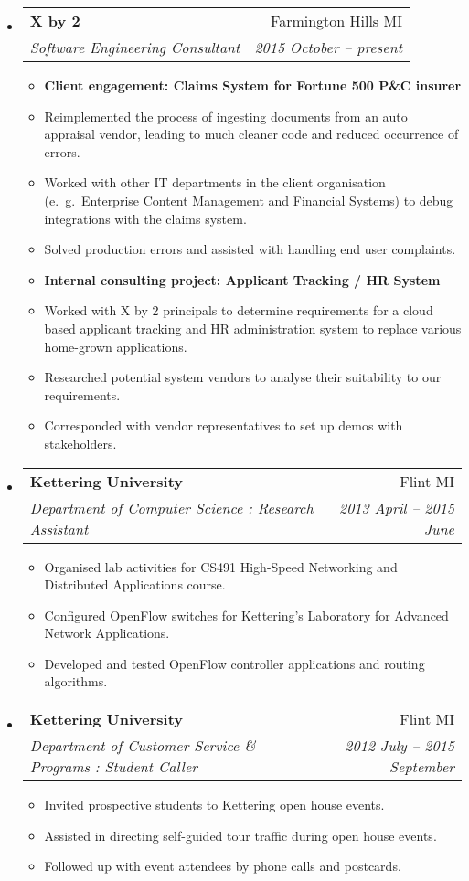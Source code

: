 \documentclass[letterpaper,10pt]{article}
\makeatletter
\newcommand{\resitem}[1]{\item #1 \vspace{-2pt}}
\newcommand{\ressubheading}[4]{
\begin{tabular*}{6.5in}{l@{\cftdotfill{\cftsecdotsep}\extracolsep{\fill}}r}
		\textbf{#1} & #2 \\
		\textit{#3} & \textit{#4} \\
\end{tabular*}\vspace{-6pt}}
\makeatother
\begin{document}
\begin{itemize}

\item
	\ressubheading{X by 2}{Farmington Hills MI}{Software Engineering Consultant}{2015 October -- present}
	\begin{itemize}
      \resitem{{\bf Client engagement: Claims System for Fortune 500 P\&C insurer}}
      \resitem{Reimplemented the process of ingesting documents from an auto appraisal vendor,
      	       leading to much cleaner code and reduced occurrence of errors.}
      \resitem{Worked with other IT departments in the client organisation (e.\ g.\ Enterprise Content Management 
      	       and Financial Systems) to debug integrations with the claims system.}
      \resitem{Solved production errors and assisted with handling end user complaints.}
      \resitem{{\bf Internal consulting project: Applicant Tracking / HR System}}
      \resitem{Worked with X by 2 principals to determine requirements for a cloud based applicant tracking
      	       and HR administration system to replace various home-grown applications.}
      \resitem{Researched potential system vendors to analyse their suitability to our requirements.}
      \resitem{Corresponded with vendor representatives to set up demos with stakeholders.}
	\end{itemize}

\item
	\ressubheading{Kettering University}{Flint MI}{Department of Computer Science : Research Assistant}{2013 April -- 2015 June}
	\begin{itemize}
       \resitem{Organised lab activities for CS491 High-Speed Networking and Distributed Applications course.}
       \resitem{Configured OpenFlow switches for Kettering's Laboratory for Advanced Network Applications.}
       \resitem{Developed and tested OpenFlow controller applications and routing algorithms.}
	\end{itemize}
	
\item
\ressubheading{Kettering University}{Flint MI}{Department of Customer Service \& Programs : Student Caller}{2012 July -- 2015 September}
\begin{itemize}
	\resitem{Invited prospective students to Kettering open house events.}
	\resitem{Assisted in directing self-guided tour traffic during open house events.}
	\resitem{Followed up with event attendees by phone calls and postcards.}
\end{itemize}


\end{itemize}
\end{document}
